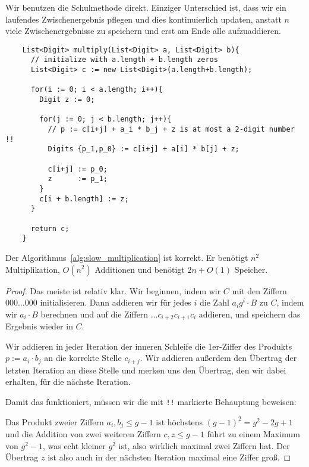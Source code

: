\begin{algorithm}
    \label{alg:slow_multiplication}
    Wir benutzen die Schulmethode direkt. Einziger Unterschied ist, dass wir ein laufendes Zwischenergebnis pflegen und dies kontinuierlich updaten, anstatt $n$ viele Zwischenergebnisse zu speichern und erst am Ende alle aufzuaddieren.

    \begin{lstlisting}
    List<Digit> multiply(List<Digit> a, List<Digit> b){
      // initialize with a.length + b.length zeros
      List<Digit> c := new List<Digit>(a.length+b.length);

      for(i := 0; i < a.length; i++){
        Digit z := 0;

        for(j := 0; j < b.length; j++){
          // p := c[i+j] + a_i * b_j + z is at most a 2-digit number !!
          Digits {p_1,p_0} := c[i+j] + a[i] * b[j] + z;

          c[i+j] := p_0;
          z      := p_1;
        }
        c[i + b.length] := z;
      }

      return c;
    }
    \end{lstlisting}
\end{algorithm}

\begin{proposition}[Korrektheit]
    Der Algorithmus~\ref{alg:slow_multiplication} ist korrekt. Er benötigt $n^2$ Multiplikation, $O(n^2)$ Additionen und benötigt $2n+O(1)$ Speicher.
\end{proposition}
\begin{proof}
    Das meiste ist relativ klar. Wir beginnen, indem wir $C$ mit den Ziffern $000\ldots 000$ initialisieren. Dann addieren wir für jedes $i$ die Zahl $a_i g^i\cdot B$ zu $C$, indem wir $a_i \cdot B$ berechnen und auf die Ziffern $\ldots c_{i+2}c_{i+1}c_i$ addieren, und speichern das Ergebnis wieder in $C$.

    \smallskip
    Wir addieren in jeder Iteration der inneren Schleife die 1er-Ziffer des Produkts $p:=a_i \cdot b_j$ an die korrekte Stelle $c_{i+j}$. Wir addieren außerdem den Übertrag der letzten Iteration an diese Stelle und merken uns den Übertrag, den wir dabei erhalten, für die nächste Iteration.

    \smallskip
    Damit das funktioniert, müssen wir die mit \lstinline{!!} markierte Behauptung beweisen:

    Das Produkt zweier Ziffern $a_i,b_j\leq g-1$ ist höchstens $(g-1)^2=g^2-2g+1$ und die Addition von zwei weiteren Ziffern $c,z\leq g-1$ führt zu einem Maximum von $g^2-1$, was echt kleiner $g^2$ ist, also wirklich maximal zwei Ziffern hat. Der Übertrag $z$ ist also auch in der nächsten Iteration maximal eine Ziffer groß.
\end{proof}

